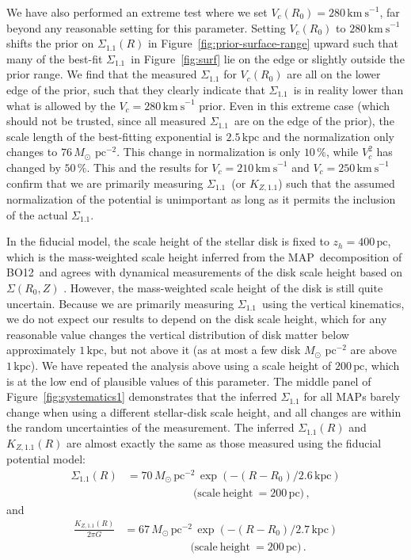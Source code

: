 \documentclass{emulateapj}
\renewcommand{\figurename}{Figure}
\newcommand{\map}{MAP}
\newcommand{\kpc}{\ensuremath{\,\mathrm{kpc}}}
\newcommand{\pc}{\ensuremath{\,\mathrm{pc}}}
\newcommand{\kms}{\ensuremath{\,\mathrm{km\ s}^{-1}}}
\newcommand{\sigoneone}{\ensuremath{\Sigma_{1.1}}}
\newcommand{\kzoneone}{\ensuremath{K_{Z,1.1}}}
\newcommand{\bo}{BO12}
\begin{document}
We have also performed an extreme test where we set $V_c(R_0) =
280\kms$, far beyond any reasonable setting for this
parameter. Setting $V_c(R_0)$ to $280\kms$ shifts the prior on
$\sigoneone(R)$ in \figurename~\ref{fig:prior-surface-range} upward
such that many of the best-fit \sigoneone\ in
\figurename~\ref{fig:surf} lie on the edge or slightly outside the
prior range. We find that the measured $\sigoneone$ for $V_c(R_0)$ are
all on the lower edge of the prior, such that they clearly indicate
that \sigoneone\ is in reality lower than what is allowed by the $V_c
= 280\kms$ prior. Even in this extreme case (which should not be
trusted, since all measured \sigoneone\ are on the edge of the prior),
the scale length of the best-fitting exponential is $2.5\kpc$ and the
normalization only changes to $76\,M_\odot\,\pc^{-2}$. This change in
normalization is only $10\,\%$, while $V_c^2$ has changed by
$50\,\%$. This and the results for $V_c = 210\kms$ and $V_c = 250\kms$
confirm that we are primarily measuring \sigoneone\ (or \kzoneone)
such that the assumed normalization of the potential is unimportant as
long as it permits the inclusion of the actual \sigoneone.

In the fiducial model, the scale height of the stellar disk is fixed
to $z_h = 400\pc$, which is the mass-weighted scale height inferred
from the \map\ decomposition of \bo\ and agrees with dynamical
measurements of the disk scale height based on $\Sigma(R_0,Z)$
\citep{Siebert03a,Zhang13a}. However, the mass-weighted scale height
of the disk is still quite uncertain. Because we are primarily
measuring \sigoneone\ using the vertical kinematics, we do not expect
our results to depend on the disk scale height, which for any
reasonable value changes the vertical distribution of disk matter
below approximately $1\kpc$, but not above it (as at most a few disk
$M_\odot\,\pc^{-2}$ are above $1\kpc$). We have repeated the analysis
above using a scale height of $200\pc$, which is at the low end of
plausible values of this parameter. The middle panel of
\figurename~\ref{fig:systematics1} demonstrates that the inferred
$\sigoneone$ for all \map s barely change when using a different
stellar-disk scale height, and all changes are within the random
uncertainties of the measurement. The inferred $\sigoneone(R)$ and
$\kzoneone(R)$ are almost exactly the same as those measured using the
fiducial potential model:
\begin{align}
  \sigoneone(R) & = 70\,M_\odot\,\mathrm{pc}^{-2}\,\exp\left(-(R-R_0)/ 2.6\kpc\right)\nonumber\\& \qquad \qquad \qquad \mathrm{(scale\ height}\ = 200\pc)\,,
\end{align}
and
\begin{align}
  \frac{\kzoneone(R)}{2\pi G} & = 67\,M_\odot\,\mathrm{pc}^{-2}\,\exp\left(-(R-R_0)/ 2.7\kpc\right)\nonumber\\ & \qquad \qquad \qquad \mathrm{(scale\ height}\ = 200\pc)\,.
\end{align}
\end{document}
